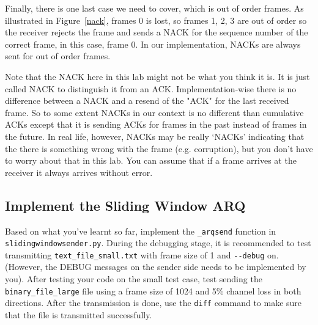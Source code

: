\documentclass[11pt]{article}
\begin{document}
Finally, there is one last case we need to cover, which is out of order frames.
As illustrated in Figure~\ref{nack}, frames 0 is lost, so frames 1, 2, 3 are out of order so the receiver rejects the frame and sends a NACK for the sequence number of the correct frame, in this case, frame 0.
In our implementation, NACKs are always sent for out of order frames.

Note that the NACK here in this lab might not be what you think it is. It is just called NACK to distinguish it from an ACK.
Implementation-wise there is no difference between a NACK and a resend of the "ACK" for the last received frame.
So to some extent NACKs in our context is no different than cumulative ACKs except that it is sending ACKs for frames in the past instead of frames in the future.
In real life, however, NACKs may be really `NACKs' indicating that the there is something wrong with the frame (e.g. corruption), but you don't have to worry about that in this lab. You can assume that if a frame arrives at the receiver it always arrives without error.


\subsection{Implement the Sliding Window ARQ}
Based on what you've learnt so far, implement the \texttt{\_arqsend} function in \texttt{slidingwindowsender.py}.
During the debugging stage, it is recommended to test transmitting \texttt{text\_file\_small.txt} with frame size of 1 and \texttt{-{}-debug} on.
(However, the DEBUG messages on the sender side needs to be implemented by you).
After testing your code on the small test case, test sending the \texttt{binary\_file\_large} file using a frame size of 1024 and 5\% channel loss in both directions.
After the transmission is done, use the \texttt{diff} command to make sure that the file is transmitted successfully.

\end{document}
